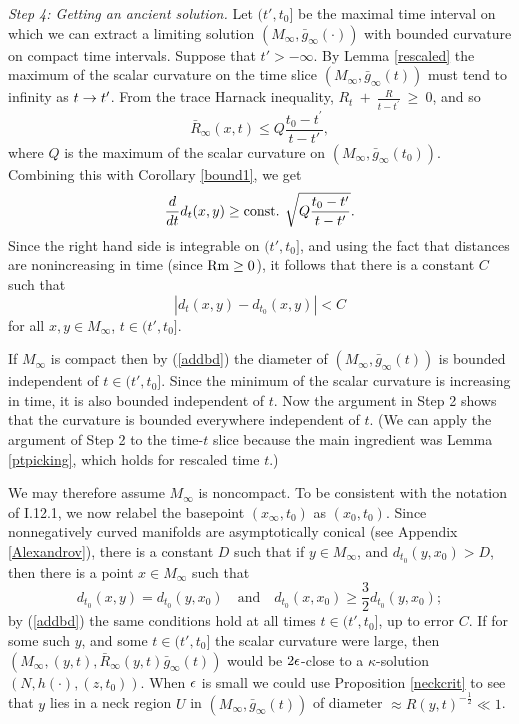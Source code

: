 \bigskip
{\em Step 4: Getting an ancient solution.}
Let $(t',t_0]$ be the maximal time interval on which
we can extract a limiting solution $(M_\infty,\bar g_\infty(\cdot))$
with bounded curvature on compact time intervals.
Suppose that $t' > -\infty$.
By Lemma \ref{rescaled} the maximum of the scalar curvature
on the time slice $(M_\infty,\bar g_\infty(t))$ must tend
to infinity as $t\rightarrow t'$.  From the trace Harnack inequality,
$R_t \: + \: \frac{R}{t - t^\prime} \: \ge \: 0$, and so
\begin{equation}
\bar R_\infty(x,t)\leq Q \frac{t_0 - t^\prime}{t-t'},
\end{equation}
where $Q$ is the maximum of the scalar curvature
on $(M_\infty,\bar g_\infty(t_0))$.  Combining this
with Corollary \ref{bound1},
we get
\begin{equation}
\frac{d}{dt}d_t(x,y)\geq \operatorname{const.} \: \sqrt{Q \frac{t_0 - t^\prime}{t-t'}}.
\end{equation}
Since the right hand side is integrable on $(t',t_0]$, and using
the fact that distances are nonincreasing in time (since $\operatorname{Rm} \geq 0$),
it follows that there is a constant $C$ such that
\begin{equation}
\label{addbd}
|d_t(x,y)-d_{t_0}(x,y)|<C
\end{equation}
for all $x,y\in M_\infty$, $t\in(t',t_0]$.

If $M_\infty$ is compact then by (\ref{addbd}) the diameter of
$(M_\infty,\bar g_\infty(t))$ is bounded independent of
$t\in (t',t_0]$.  Since the minimum of the scalar
curvature is increasing in
time, it is also bounded independent of $t$.  Now the argument
in Step 2 shows that the curvature is bounded everywhere
independent of $t$.  (We can apply the argument of Step 2 to the
time-$t$ slice because the main ingredient was
Lemma \ref{ptpicking}, which holds for rescaled time $t$.)

We may therefore assume $M_\infty$ is noncompact.
To be consistent with the notation of I.12.1, we now relabel
the basepoint $(x_\infty, t_0)$ as $(x_0, t_0)$.  Since
nonnegatively curved manifolds are asymptotically conical
(see Appendix \ref{Alexandrov}),
there is a constant $D$ such that if $y\in M_\infty$,
and $d_{t_0}(y,x_0)>D$, then there is a point $x\in M_\infty$
such that
\begin{equation}
\label{dists}
d_{t_0}(x,y)=d_{t_0}(y,x_0)\quad \mbox{and}
\quad d_{t_0}(x,x_0)\geq \frac{3}{2}d_{t_0}(y,x_0);
\end{equation}
by (\ref{addbd})
the same conditions hold at all times $t\in(t',t_0]$, up to error
$C$.   If for some such $y$, and some $t\in (t',t_0]$ the scalar
curvature were large, then $(M_\infty,(y,t),\bar R_\infty(y,t)\bar
g_\infty(t))$
would be $2\epsilon$-close to a $\kappa$-solution $(N,h(\cdot),(z,t_0))$.  When
$\epsilon$ is small we could  use Proposition \ref{neckcrit} to
see that $y$ lies in a neck region $U$ in $(M_\infty,\bar g_\infty(t))$
of diameter $\approx R(y,t)^{-\frac{1}{2}}\ll 1$.


